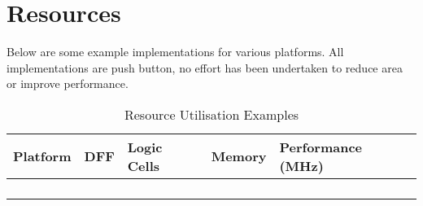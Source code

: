 \chapter{Resources}

Below are some example implementations for various platforms. All implementations are push button, no effort has been undertaken to reduce area or improve performance.

\begin{longtable}[]{@{}lllll@{}}
	\toprule
		\textbf{Platform} & \textbf{DFF} & \textbf{Logic Cells} &
		\textbf{Memory} & \textbf{Performance (MHz)}\tabularnewline
	\midrule
	\endhead
		& & & &\tabularnewline
		& & & &\tabularnewline
		& & & &\tabularnewline
	\bottomrule
	\caption{Resource Utilisation Examples}
	\label{tab:RESOURCES}
\end{longtable}